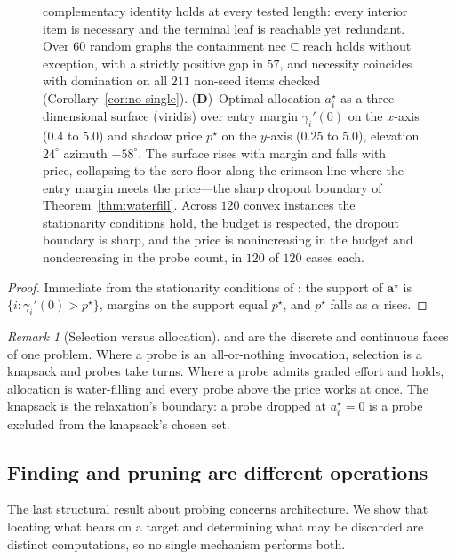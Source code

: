 \documentclass[11pt,twocolumn,a4paper]{article}
\theoremstyle{dirthm}
\theoremstyle{definition}
\theoremstyle{remark}
\newtheorem{remark}[theorem]{Remark}
\newcommand{\price}{p^{\star}}
\newcommand{\att}{\alpha}
\newcommand{\alloc}{\mathbf{a}}
\newcommand{\gain}{\gamma}
\newcommand{\reach}{\mathrm{reach}}
\newcommand{\nec}{\mathrm{nec}}
\newcommand{\set}[1]{\{#1\}}
\begin{document}
\begin{figure}[!htbp]
{    complementary identity holds at every tested length: every interior item is
    necessary and the terminal leaf is reachable yet redundant. Over $60$
    random graphs the containment $\nec\subseteq\reach$ holds without
    exception, with a strictly positive gap in $57$, and necessity coincides
    with domination on all $211$ non-seed items checked
    (Corollary~\ref{cor:no-single}).
    (\textbf{D})~Optimal allocation $a_i^{\star}$ as a three-dimensional
    surface (viridis) over entry margin $\gain_i'(0)$ on the $x$-axis ($0.4$ to
    $5.0$) and shadow price $\price$ on the $y$-axis ($0.25$ to $5.0$),
    elevation $24^{\circ}$ azimuth $-58^{\circ}$. The surface rises with margin
    and falls with price, collapsing to the zero floor along the crimson line
    where the entry margin meets the price---the sharp dropout boundary of
    Theorem~\ref{thm:waterfill}. Across $120$ convex instances the stationarity
    conditions hold, the budget is respected, the dropout boundary is sharp,
    and the price is nonincreasing in the budget and nondecreasing in the probe
    count, in $120$ of $120$ cases each.}
    \label{fig:panel5}
\end{figure}

\begin{proof}
Immediate from the stationarity conditions of : the
support of $\alloc^{\star}$ is $\set{i:\gain_i'(0)>\price}$, margins on the
support equal $\price$, and $\price$ falls as $\att$ rises.
\end{proof}

\begin{remark}[Selection versus allocation]
\label{rem:selection-vs-alloc}
 and  are the discrete and continuous
faces of one problem. Where a probe is an all-or-nothing invocation, selection
is a knapsack and probes take turns. Where a probe admits graded effort and
 holds, allocation is water-filling and every probe above the
price works at once. The knapsack is the relaxation's boundary: a probe
dropped at $a_i^{\star}=0$ is a probe excluded from the knapsack's chosen set.
\end{remark}

\subsection{Finding and pruning are different operations}

The last structural result about probing concerns architecture. We show that
locating what bears on a target and determining what may be discarded are
distinct computations, so no single mechanism performs both.
\end{document}
